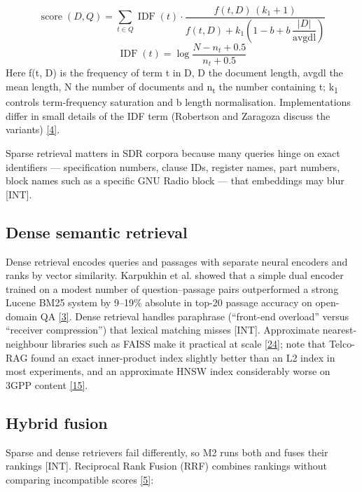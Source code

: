 \documentclass[11pt,a4paper]{article}
\newcommand{\prov}[1]{\textsf{\footnotesize[#1]}}
\begin{document}
\begin{equation*}
\operatorname{score}(D, Q) = \sum_{t \in Q} \operatorname{IDF}(t) \cdot \frac{f(t, D)\,(k_1 + 1)}{f(t, D) + k_1 \left(1 - b + b\,\dfrac{|D|}{\mathrm{avgdl}}\right)}
\end{equation*}
\begin{equation*}
\operatorname{IDF}(t) = \log \frac{N - n_t + 0.5}{n_t + 0.5}
\end{equation*}
Here f(t, D) is the frequency of term t in D, \textbar{}D\textbar{} the document length, avgdl the mean length, N the number of documents and n\textsubscript{t} the number containing t; k\textsubscript{1} controls term-frequency saturation and b length normalisation. Implementations differ in small details of the IDF term (Robertson and Zaragoza discuss the variants) \hyperlink{ref4}{[4]}.

Sparse retrieval matters in SDR corpora because many queries hinge on exact identifiers --- specification numbers, clause IDs, register names, part numbers, block names such as a specific GNU Radio block --- that embeddings may blur \prov{INT}.

\subsection{Dense semantic retrieval}
Dense retrieval encodes queries and passages with separate neural encoders and ranks by vector similarity. Karpukhin et al. showed that a simple dual encoder trained on a modest number of question--passage pairs outperformed a strong Lucene BM25 system by 9--19\% absolute in top-20 passage accuracy on open-domain QA \hyperlink{ref3}{[3]}. Dense retrieval handles paraphrase (``front-end overload'' versus ``receiver compression'') that lexical matching misses \prov{INT}. Approximate nearest-neighbour libraries such as FAISS make it practical at scale \hyperlink{ref24}{[24]}; note that Telco-RAG found an exact inner-product index slightly better than an L2 index in most experiments, and an approximate HNSW index considerably worse on 3GPP content \hyperlink{ref15}{[15]}.

\subsection{Hybrid fusion}
Sparse and dense retrievers fail differently, so M2 runs both and fuses their rankings \prov{INT}. Reciprocal Rank Fusion (RRF) combines rankings without comparing incompatible scores \hyperlink{ref5}{[5]}:
\end{document}
